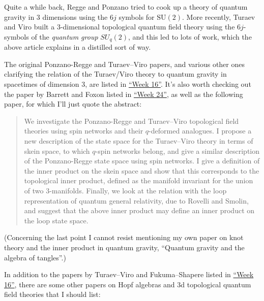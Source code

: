\documentclass{article}
\def\tightlist{}
\renewcommand{\texttt}[1]{%
  \begingroup
  \ttfamily
  \begingroup\lccode`~=`/\lowercase{\endgroup\def~}{/\discretionary{}{}{}}%
  \begingroup\lccode`~=`[\lowercase{\endgroup\def~}{[\discretionary{}{}{}}%
  \begingroup\lccode`~=`.\lowercase{\endgroup\def~}{.\discretionary{}{}{}}%
  \catcode`/=\active\catcode`[=\active\catcode`.=\active
  \scantokens{#1\noexpand}%
  \endgroup
}
\begin{document}
Quite a while back, Regge and Ponzano tried to cook up a theory of
quantum gravity in 3 dimensions using the \(6j\) symbols for
\(\mathrm{SU}(2)\). More recently, Turaev and Viro built a
\(3\)-dimensional topological quantum field theory using the
\(6j\)-symbols of the \emph{quantum group} \(SU_q(2)\), and this led to
lots of work, which the above article explains in a distilled sort of
way.

The original Ponzano-Regge and Turaev--Viro papers, and various other
ones clarifying the relation of the Turaev/Viro theory to quantum
gravity in spacetimes of dimension 3, are listed in
\protect\hyperlink{week16}{``Week 16''}. It's also worth checking out
the paper by Barrett and Foxon listed in
\protect\hyperlink{week24}{``Week 24''}, as well as the following paper,
for which I'll just quote the abstract:


\begin{quote}
We investigate the Ponzano-Regge and Turaev--Viro topological field
theories using spin networks and their \(q\)-deformed analogues. I
propose a new description of the state space for the Turaev--Viro theory
in terms of skein space, to which \(q\)-spin networks belong, and give a
similar description of the Ponzano-Regge state space using spin
networks. I give a definition of the inner product on the skein space
and show that this corresponds to the topological inner product, defined
as the manifold invariant for the union of two 3-manifolds. Finally, we
look at the relation with the loop representation of quantum general
relativity, due to Rovelli and Smolin, and suggest that the above inner
product may define an inner product on the loop state space.
\end{quote}

(Concerning the last point I cannot resist mentioning my own paper on
knot theory and the inner product in quantum gravity, ``Quantum gravity
and the algebra of tangles''.)

In addition to the papers by Turaev--Viro and Fukuma--Shapere listed in
\protect\hyperlink{week16}{``Week 16''}, there are some other papers on
Hopf algebras and 3d topological quantum field theories that I should
list:
\end{document}
